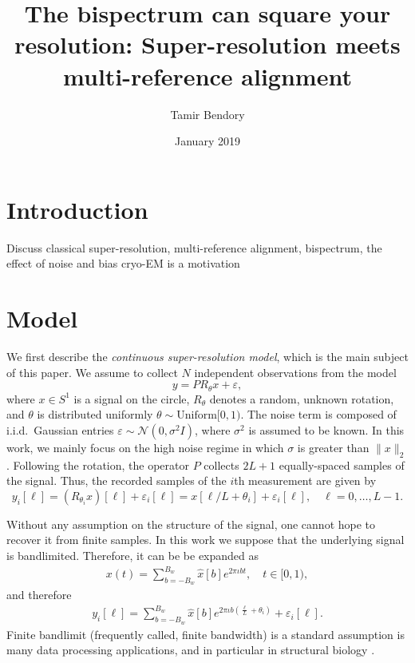 \documentclass[english,12pt]{article}
\newcommand{\I}{\iota}
\newcommand{\tB}{B_w}
\newcommand{\SR}{super-resolution }
\newcommand{\TODO}[1]{{\color{red}{[#1]}}}
\numberwithin{equation}{section}
\numberwithin{thm}{section} %
\begin{document}
\title{The bispectrum can square your resolution: Super-resolution meets multi-reference alignment}

\author{Tamir Bendory}
\date{January 2019}
\maketitle


\section{Introduction}

Discuss classical super-resolution, multi-reference alignment, bispectrum, the effect of noise and bias
cryo-EM is a motivation~\cite{chen2018single}

\section{Model}

We first describe the  \emph{continuous \SR model}, which is the main subject of this paper.  We assume to collect $N$ independent observations from the model 
\begin{equation} \label{eq:model}
y = PR_\theta x + \varepsilon,
\end{equation}
where $x\in S^1$ is a signal on the circle, $R_\theta$ denotes a random, unknown rotation, and $\theta$ is distributed uniformly $\theta\sim \text{Uniform}[0,1)$. 
The noise term is composed of  i.i.d.\  Gaussian entries  $\varepsilon\sim\mathcal{N}(0,\sigma^2 I)$, where $\sigma^2$ is assumed to be known.
In this work, we mainly focus on the high noise regime in which $\sigma$ is greater than $\|x\|_2$. 
Following the rotation, the operator $P$ collects $2L+1$ equally-spaced samples of the signal. Thus, the recorded samples of the $i$th measurement are given by 
\begin{equation} \label{eq:continuous_measurements}
y_i[\ell] = \left(R_{\theta_i} x\right)[\ell] + \varepsilon_i[\ell] =  x[\ell/L+\theta_i] + \varepsilon_i[\ell], \quad \ell=0,\ldots,L-1.
\end{equation}

Without any assumption on the structure of the signal, one cannot hope to recover it from finite samples. In this work we suppose that 
the underlying  signal  is bandlimited. Therefore, it can be  be expanded as 
\begin{eqnarray} \label{eq:fourier_expansion}
x(t) = \sum_{b=-\tB}^{\tB}\hat{x}[b]e^{2\pi\I bt }, \quad t\in[0,1),
\end{eqnarray}
and therefore 
\begin{eqnarray} \label{eq:fourier_expansion}
y_i[\ell] = \sum_{b=-\tB}^{\tB}\hat{x}[b]e^{2\pi\I b\left(\frac{\ell}{L}+\theta_i\right) }+ \varepsilon_i[\ell].
\end{eqnarray}
Finite bandlimit (frequently called, finite bandwidth) is a standard assumption is many data processing applications, and in particular in structural biology \TODO{REF}. 
\end{document}
